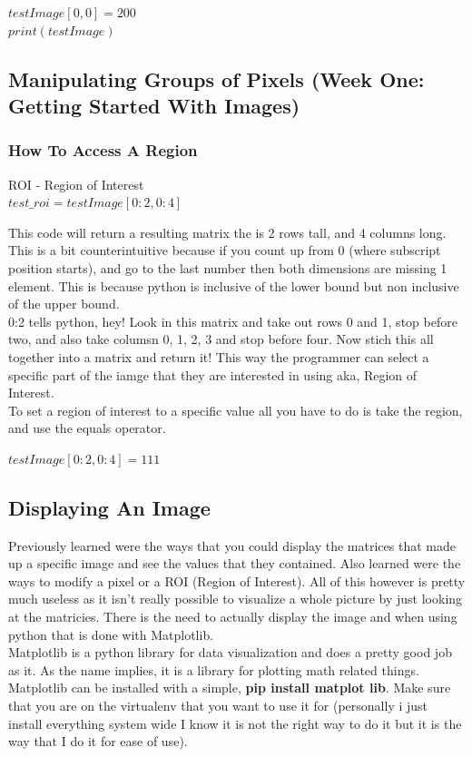 \documentclass[fleqn]{article}
\begin{document}
    \begin{center}
      $testImage[0,0]=200$\\
      $print(testImage)$
    \end{center}

    \subsection{Manipulating Groups of Pixels (Week One: Getting Started With Images)}
    \subsubsection{How To Access A Region}

    \begin{center}
      ROI - Region of Interest\\
      $test\_roi = testImage[0:2,0:4]$\\
    \end{center}

    This code will return a resulting matrix the is 2 rows tall, and 4 columns long. This is a bit counterintuitive because if you count up from 0 (where subscript position starts), and go to the last number then both dimensions are missing 1 element. This is because python is inclusive of the lower bound but non inclusive of the upper bound. \\
    0:2 tells python, hey! Look in this matrix and take out rows 0 and 1, stop before two, and also take columsn 0, 1, 2, 3 and stop before four. Now stich this all together into a matrix and return it! This way the programmer can select a specific part of the iamge that they are interested in using aka, Region of Interest.\\
    To set a region of interest to a specific value all you have to do is take the region, and use the equals operator.

    \begin{center}
      $testImage[0:2,0:4] = 111$
    \end{center}

    \subsection{Displaying An Image}
    Previously learned were the ways that you could display the matrices that made up a specific image and see the values that they contained. Also learned were the ways to modify a pixel or a ROI (Region of Interest). All of this however is pretty much useless as it isn't really possible to visualize a whole picture by just looking at the matricies. There is the need to actually display the image and when using python that is done with Matplotlib.\\
    Matplotlib is a python library for data visualization and does a pretty good job as it. As the name implies, it is a library for plotting math related things. Matplotlib can be installed with a simple, \textbf{pip install matplot lib}. Make sure that you are on the virtualenv that you want to use it for (personally i just install everything system wide I know it is not the right way to do it but it is the way that I do it for ease of use).
\end{document}
